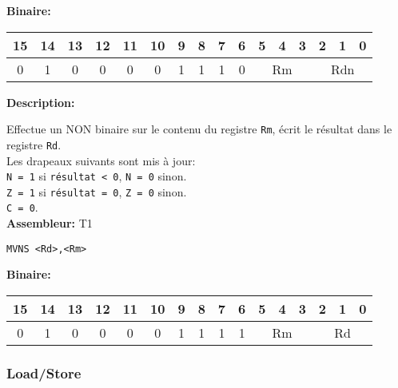 \documentclass{article}
\begin{document}
    \textbf{Binaire:}\\

    \begin{tabular}{| c c c c c c c c c c c c c c c c |}
        \hline
        15 & 14 & 13 & 12 & 11 & 10 & \multicolumn{1}{|c}{9} & 8 & 7 & 6 & \multicolumn{1}{|c}{5} & 4 & 3 & \multicolumn{1}{|c}{2} & 1 & 0 \\
        \hline
        0 & 1 & 0 & 0 & 0 & 0 & \multicolumn{1}{|c}{1} & 1 & 1 & 0 & \multicolumn{3}{|c}{Rm} & \multicolumn{3}{|c|}{Rdn} \\
        \hline
    \end{tabular}



    \textbf{Description: }

    Effectue un NON binaire sur le contenu du registre \texttt{Rm}, écrit le résultat dans le registre \texttt{Rd}.\\
    Les drapeaux suivants sont mis à jour:\\
    \texttt{N = 1} si \texttt{résultat < 0}, \texttt{N = 0} sinon.\\
    \texttt{Z = 1} si \texttt{résultat = 0}, \texttt{Z = 0} sinon.\\
    \texttt{C = 0}.\\

    \textbf{Assembleur:} T1

    \begin{lstlisting}
MVNS <Rd>,<Rm>
    \end{lstlisting}

    \textbf{Binaire:}\\

    \begin{tabular}{| c c c c c c c c c c c c c c c c |}
        \hline
        15 & 14 & 13 & 12 & 11 & 10 & \multicolumn{1}{|c}{9} & 8 & 7 & 6 & \multicolumn{1}{|c}{5} & 4 & 3 & \multicolumn{1}{|c}{2} & 1 & 0 \\
        \hline
        0 & 1 & 0 & 0 & 0 & 0 & \multicolumn{1}{|c}{1} & 1 & 1 & 1 & \multicolumn{3}{|c}{Rm} & \multicolumn{3}{|c|}{Rd} \\
        \hline
    \end{tabular}

    \subsubsection{Load/Store}
    \label{subsubsec:LoadStore}
\end{document}
